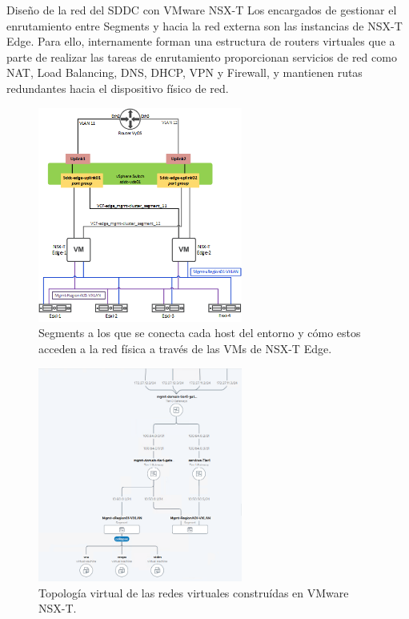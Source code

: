 \begin{subsubsection}{Diseño de la red del SDDC con VMware NSX-T}
    Los encargados de gestionar el enrutamiento entre Segments y hacia la red externa son las instancias de NSX-T Edge. Para ello, internamente forman una estructura de routers virtuales que a parte de realizar las tareas de enrutamiento proporcionan servicios de red como NAT, Load Balancing, DNS, DHCP, VPN y Firewall, y mantienen rutas redundantes hacia el dispositivo físico de red.
    \begin{figure}[h]
        \centering
        \includegraphics[width=0.6\textwidth]{imaxes/pruebaconcepto/estructura_NSX_T.png}
        \caption{Segments a los que se conecta cada host del entorno y cómo estos acceden a la red física a través de las VMs de NSX-T Edge.}
        \label{fig:estructura-NSXT}
      \end{figure}
    \FloatBarrier
    \begin{figure}[h]
        \centering
        \includegraphics[width=0.6\textwidth]{imaxes/pruebaconcepto/vrealize/topology-vrops.png}
        \caption{Topología virtual de las redes virtuales construídas en VMware NSX-T.}

\end{figure}
\end{subsubsection}
